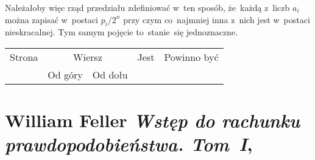 \documentclass[a4paper,11pt]{article}
\numberwithin{equation}{section}
\begin{document}
Należałoby więc rząd przedziału zdefiniować w~ten sposób, że~każdą
z~liczb $a_{ i }$ można zapisać w~postaci $p_{ i } / 2^{ n }$ przy
czym co~najmniej inna z~nich jest w~postaci nieskracalnej. Tym samym
pojęcie to~stanie~się jednoznaczne.

\VerSpaceFour







\begin{center}

  \begin{tabular}{|c|c|c|c|c|}
    \hline
    Strona & \multicolumn{2}{c|}{Wiersz} & Jest
                              & Powinno być \\ \cline{2-3}
    & Od góry & Od dołu & & \\
    \hline
    \hline
  \end{tabular}

\end{center}

\VerSpaceSix











\section{William Feller \textit{Wstęp do rachunku prawdopodobieństwa. Tom~I},
  \cite{FellerWstepDoRachunkuPrawdopodobienstwaVolI2006}}
\end{document}
